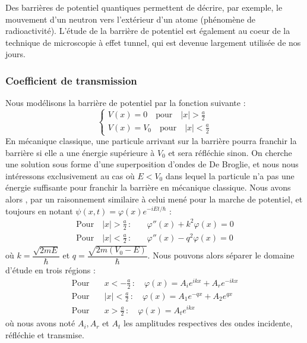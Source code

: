 \documentclass[11pt,fleqn]{book} %
\begin{document}
Des barrières de potentiel quantiques permettent de décrire, par exemple, le mouvement d'un neutron vers l'extérieur d'un atome (phénomène de radioactivité). L'étude de la barrière de potentiel est également au coeur de la technique de microscopie à effet tunnel, qui est devenue largement utilisée de nos jours.

\subsubsection{Coefficient de transmission}

Nous modélisons la barrière de potentiel par la fonction suivante :
\begin{equation}
	\begin{cases}
		V(x) = 0 \quad \mathrm{pour} \quad |x|>\frac{a}{2} \\
		V(x) = V_0 \quad \mathrm{pour} \quad |x| < \frac{a}{2}
	\end{cases}
\end{equation}
En mécanique classique, une particule arrivant sur la barrière pourra franchir la barrière si elle a une énergie supérieure à $V_0$ et sera réfléchie sinon. On cherche une solution sous forme d'une superposition d'ondes de De Broglie, et nous nous intéressons exclusivement au cas où $E<V_0$ dans lequel la particule n'a pas une énergie suffisante pour franchir la barrière en mécanique classique. Nous avons alors , par un raisonnement similaire à celui mené pour la marche de potentiel, et toujours en notant $\psi(x,t) = \varphi(x) e^{-i E t / \hbar}$ :
\begin{align}
	\mathrm{Pour} \quad |x|>\frac{a}{2}\,: \quad &\varphi''(x) + k^2 \varphi(x) = 0 \\
	\mathrm{Pour} \quad |x|<\frac{a}{2}\,: \quad &\varphi''(x) - q^2 \varphi(x) = 0
\end{align}
où $k = \dfrac{\sqrt{2mE}}{\hbar}$ et $q = \dfrac{\sqrt{2m(V_0-E)}}{\hbar}$.
Nous pouvons alors séparer le domaine d'étude en trois régions :
\begin{align}
	\mathrm{Pour}& \quad x<-\frac{a}{2}\,: \quad \varphi(x) = A_i e^{ikx} + A_r e^{-ikx} \\
	\mathrm{Pour}& \quad |x|<\frac{a}{2}\,: \quad \varphi(x) = A_1 e^{-qx} + A_2 e^{qx} \\
	\mathrm{Pour}& \quad x>\frac{a}{2}\,: \quad \varphi(x) = A_t e^{ikx}
\end{align}
où nous avons noté $A_i, A_r$ et $A_t$ les amplitudes respectives des ondes incidente, réfléchie et transmise. 
\end{document}
